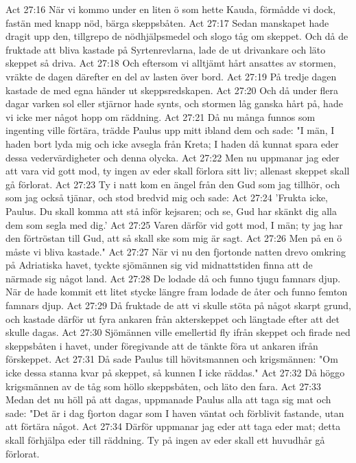 Act 27:16  När vi kommo under en liten ö som hette Kauda, förmådde vi dock, fastän med knapp nöd, bärga skeppsbåten.
Act 27:17  Sedan manskapet hade dragit upp den, tillgrepo de nödhjälpsmedel och slogo tåg om skeppet. Och då de fruktade att bliva kastade på Syrtenrevlarna, lade de ut drivankare och läto skeppet så driva.
Act 27:18  Och eftersom vi alltjämt hårt ansattes av stormen, vräkte de dagen därefter en del av lasten över bord.
Act 27:19  På tredje dagen kastade de med egna händer ut skeppsredskapen.
Act 27:20  Och då under flera dagar varken sol eller stjärnor hade synts, och stormen låg ganska hårt på, hade vi icke mer något hopp om räddning.
Act 27:21  Då nu många funnos som ingenting ville förtära, trädde Paulus upp mitt ibland dem och sade: "I män, I haden bort lyda mig och icke avsegla från Kreta; I haden då kunnat spara eder dessa vedervärdigheter och denna olycka.
Act 27:22  Men nu uppmanar jag eder att vara vid gott mod, ty ingen av eder skall förlora sitt liv; allenast skeppet skall gå förlorat.
Act 27:23  Ty i natt kom en ängel från den Gud som jag tillhör, och som jag också tjänar, och stod bredvid mig och sade:
Act 27:24  'Frukta icke, Paulus. Du skall komma att stå inför kejsaren; och se, Gud har skänkt dig alla dem som segla med dig.'
Act 27:25  Varen därför vid gott mod, I män; ty jag har den förtröstan till Gud, att så skall ske som mig är sagt.
Act 27:26  Men på en ö måste vi bliva kastade."
Act 27:27  När vi nu den fjortonde natten drevo omkring på Adriatiska havet, tyckte sjömännen sig vid midnattstiden finna att de närmade sig något land.
Act 27:28  De lodade då och funno tjugu famnars djup. När de hade kommit ett litet stycke längre fram lodade de åter och funno femton famnars djup.
Act 27:29  Då fruktade de att vi skulle stöta på något skarpt grund, och kastade därför ut fyra ankaren från akterskeppet och längtade efter att det skulle dagas.
Act 27:30  Sjömännen ville emellertid fly ifrån skeppet och firade ned skeppsbåten i havet, under föregivande att de tänkte föra ut ankaren ifrån förskeppet.
Act 27:31  Då sade Paulus till hövitsmannen och krigsmännen: "Om icke dessa stanna kvar på skeppet, så kunnen I icke räddas."
Act 27:32  Då höggo krigsmännen av de tåg som höllo skeppsbåten, och läto den fara.
Act 27:33  Medan det nu höll på att dagas, uppmanade Paulus alla att taga sig mat och sade: "Det är i dag fjorton dagar som I haven väntat och förblivit fastande, utan att förtära något.
Act 27:34  Därför uppmanar jag eder att taga eder mat; detta skall förhjälpa eder till räddning. Ty på ingen av eder skall ett huvudhår gå förlorat.
